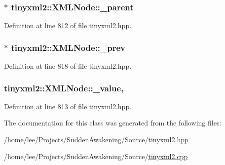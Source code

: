 \hypertarget{classtinyxml2_1_1_x_m_l_node_a176dd1c4965c21c366de192164aa2c13}{
\subsubsection[{\-\_\-parent}]{$\ast$ tinyxml2\-::\-X\-M\-L\-Node\-::\-\_\-parent\hspace{0.3cm}{\ttfamily [protected]}}}\label{classtinyxml2_1_1_x_m_l_node_a176dd1c4965c21c366de192164aa2c13}


Definition at line 812 of file tinyxml2.\-hpp.

\hypertarget{classtinyxml2_1_1_x_m_l_node_a9739eb0fb9a1188266052055e7a6bf6b}{
\subsubsection[{\-\_\-prev}]{$\ast$ tinyxml2\-::\-X\-M\-L\-Node\-::\-\_\-prev\hspace{0.3cm}{\ttfamily [protected]}}}\label{classtinyxml2_1_1_x_m_l_node_a9739eb0fb9a1188266052055e7a6bf6b}


Definition at line 818 of file tinyxml2.\-hpp.

\hypertarget{classtinyxml2_1_1_x_m_l_node_a3ea9884098b8379de2bb5ab3fc85c0fc}{
\subsubsection[{\-\_\-value}]{ tinyxml2\-::\-X\-M\-L\-Node\-::\-\_\-value\hspace{0.3cm}{\ttfamily [mutable]}, {\ttfamily [protected]}}}\label{classtinyxml2_1_1_x_m_l_node_a3ea9884098b8379de2bb5ab3fc85c0fc}


Definition at line 813 of file tinyxml2.\-hpp.



The documentation for this class was generated from the following files\-:\begin{DoxyCompactItemize}
\item 
/home/lee/\-Projects/\-Sudden\-Awakening/\-Source/\hyperlink{tinyxml2_8hpp}{tinyxml2.\-hpp}\item 
/home/lee/\-Projects/\-Sudden\-Awakening/\-Source/\hyperlink{tinyxml2_8cpp}{tinyxml2.\-cpp}\end{DoxyCompactItemize}
